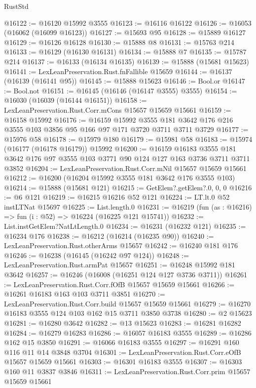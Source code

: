\begin{lexlean}{RustStd}
\begin{coremodule}
{\begin{coremodule}
{{{{{{{{{{{{{{{{{{{{{{{{{{{{{{{{{{{{{{{{{{{{{{{@16122 := @16120 @15992 @3555
@16123 := @16116 @16122
@16126 := @16053 (@16062 (@16099 @16123))
@16127 := @15693 @95
@16128 := @15889 @16127
@16129 := @16126 @16128
@16130 := @15888 @8
@16131 := @15763 @214
@16133 := @16129 (@16130 @16131)
@16134 := @15888 @7
@16135 := @15787 @214
@16137 := @16133 (@16134 @16135)
@16139 := @15888 (@15681 @15623)
@16141 := LexLeanPreservation.Rust.fnFallible @15659
@16144 := @16137 (@16139 (@16141 @95))
@16145 := @15888 @15623
@16146 := Bool.or
@16147 := Bool.not
@16151 := @16145 (@16146 (@16147 @3555) @3555)
@16154 := @16030 (@16039 (@16144 @16151))
@16158 := LexLeanPreservation.Rust.Corr.mCons @15657 @15659 @15661
@16159 := @16158 @15992
@16176 := @16159
    @15992
    @3555
    @181
    @3642
    @176
    @216
    @3555
    @103
    @3856
    @95
    @166
    @97
    @171
    @3720
    @3711
    @3711
    @3729
@16177 := @15976 @58
@16178 := @15979 @180
@16179 := @15981 @58
@16183 := @15974 (@16177 (@16178 @16179)) @15992
@16200 := @16159
    @16183
    @3555
    @181
    @3642
    @176
    @97
    @3555
    @103
    @3771
    @90
    @124
    @127
    @163
    @3736
    @3711
    @3711
    @3852
@16204 := LexLeanPreservation.Rust.Corr.mNil @15657 @15659 @15661
@16212 := @16200 (@16204 @15992 @3555 @181 @3642 @176 @3555 @103)
@16214 := @15888 (@15681 @121)
@16215 := GetElem?.getElem?.{0, 0, 0}
@16216 := @6 @121
@16219 := @16215 @16216 @52 @121
@16224 := LT.lt.{0} @52 instLTNat @15697
@16225 := List.length.{0}
@16231 := @16219 (fun (as : @16216) => fun (i : @52) => @16224 (@16225 @121 @15741))
@16232 := List.instGetElem?NatLtLength.{0}
@16234 := @16231 (@16232 @121)
@16235 := @16234 @176
@16238 := @16212 (@16214 (@16235 @90))
@16240 := LexLeanPreservation.Rust.otherArms @15657
@16242 := @16240 @181 @176
@16246 := @16238 (@16145 (@16242 @97 @124))
@16248 := LexLeanPreservation.Rust.armPat @15657
@16251 := @16248 @15992 @181 @3642
@16257 := @16246 (@16008 (@16251 @124 @127 @3736 @3711))
@16261 := LexLeanPreservation.Rust.Corr.fOfB @15657 @15659 @15661
@16266 := @16261 @16183 @163 @103 @3711 @3851
@16270 := LexLeanPreservation.Rust.Corr.build @15657 @15659 @15661
@16279 := @16270 @16183 @3555 @124 @103 @162 @15 @3711 @3850 @3738
@16280 := @2 @15623
@16281 := @16280 @3642
@16282 := @13 @15623
@16283 := @16281 @16282
@16284 := @16279 @16283
@16286 := @16057 @16183 @3555
@16289 := @16286 @162 @15 @3850
@16291 := @16066 @16183 @3555
@16297 := @16291 @160 @116 @11 @14 @3848 @3704
@16301 := LexLeanPreservation.Rust.Corr.eOfB @15657 @15659 @15661
@16303 := @16301 @16183 @3555
@16307 := @16303 @160 @11 @3837 @3846
@16311 := LexLeanPreservation.Rust.Corr.prim @15657 @15659 @15661
}}}}}}}}}}}}}}}}}}}}}}}}}}}}}}}}}}}}}}}}}}}}}}}
\end{coremodule}}
\end{coremodule}
\end{lexlean}
